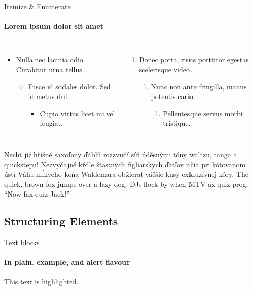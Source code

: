 \documentclass{beamer}
\begin{document}
{{    \begin{frame}[label=lists]{Itemize \& Enumerate}
      \framesubtitle{Lorem ipsum dolor sit amet}
      \begin{columns}[onlytextwidth]
          \begin{itemize}
            \item Nulla nec lacinia odio. Curabitur urna tellus.
            \begin{itemize}
              \item Fusce id sodales dolor. Sed id metus dui.
              \begin{itemize}
                \item Cupio virtus licet mi vel feugiat.
              \end{itemize}
            \end{itemize}
          \end{itemize}
          \begin{enumerate}
            \item Donec porta, risus porttitor egestas scelerisque video.
            \begin{enumerate}
              \item Nunc non ante fringilla, manus potentis cario.
              \begin{enumerate}
                \item Pellentesque servus morbi tristique.
              \end{enumerate}
            \end{enumerate}
          \end{enumerate}
      \end{columns}
      \bigskip
      \justifying

      {Nechť již hříšné saxofony ďáblů
      rozzvučí síň úděsnými tóny waltzu, tanga a quickstepu!}
      { Nezvyčajné kŕdle šťastných figliarskych
      ďatľov učia pri kótovanom ústí Váhu mĺkveho koňa Waldemara
      obžierať väč\-šie kusy exkluzívnej kôry.}
      {The quick, brown fox jumps over a lazy
      dog. DJs flock by when MTV ax quiz prog. “Now fax quiz Jack!”}
    \end{frame}

    \subsection{Structuring Elements}
    \begin{frame}[label=simmonshall]{Text blocks}
      \framesubtitle{In plain, example, and \alert{alert} flavour}
      \alert{This text} is highlighted.


\end{frame}}}
\end{document}
